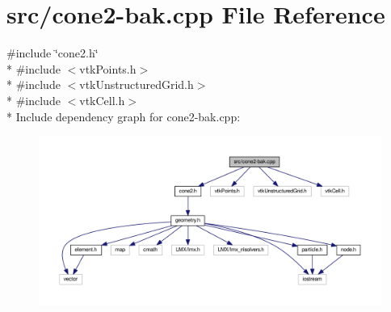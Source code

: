 \hypertarget{cone2-bak_8cpp}{\section{src/cone2-\/bak.cpp File Reference}
\label{cone2-bak_8cpp}
}
{\ttfamily \#include \char`\"{}cone2.\-h\char`\"{}}\\*
{\ttfamily \#include $<$vtk\-Points.\-h$>$}\\*
{\ttfamily \#include $<$vtk\-Unstructured\-Grid.\-h$>$}\\*
{\ttfamily \#include $<$vtk\-Cell.\-h$>$}\\*
Include dependency graph for cone2-\/bak.cpp\-:
\nopagebreak
\begin{figure}[H]
\begin{center}
\leavevmode
\includegraphics[width=350pt]{cone2-bak_8cpp__incl}
\end{center}
\end{figure}
